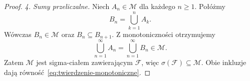\begin{proof}
\emph{4. Sumy przeliczalne.}
Niech $A_n\in\mathcal{M}$ dla każdego $n\geq1$. Połóżmy
\[
  B_n=\bigcup_{k=1}^{n}A_k.
\]
Wówczas $B_n\in\mathcal{M}$ oraz $B_n\subseteq B_{n+1}$.
Z monotoniczności otrzymujemy
\[
  \bigcup_{n=1}^{\infty}A_n
  =\bigcup_{n=1}^{\infty}B_n\in\mathcal{M}.
\]
Zatem $\mathcal{M}$ jest sigma-ciałem zawierającym $\mathcal{F}$,
więc $\sigma(\mathcal{F})\subseteq\mathcal{M}$.
Obie inkluzje dają równość~\eqref{eq:twierdzenie-monotoniczne}.
\end{proof}
